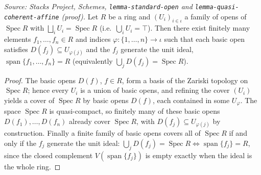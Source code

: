 \begin{lemma}
  \label{lem:exists_finite_basicOpen_subcover}
  \textit{Source: Stacks Project, Schemes, \texttt{lemma-standard-open} and
  \texttt{lemma-quasi-coherent-affine} (proof).}
  Let \(R\) be a ring and \((U_i)_{i \in \iota}\) a family of opens of
  \(\operatorname{Spec} R\) with \(\bigsqcup_i U_i = \operatorname{Spec} R\) (i.e.\
  \(\bigcup_i U_i = \top\)). Then there exist finitely many elements
  \(f_1, \ldots, f_n \in R\) and indices \(\varphi : \{1, \ldots, n\} \to \iota\) such
  that each basic open satisfies \(D(f_j) \subseteq U_{\varphi(j)}\) and the \(f_j\)
  generate the unit ideal, \(\operatorname{span}\{f_1, \ldots, f_n\} = R\) (equivalently
  \(\bigcup_j D(f_j) = \operatorname{Spec} R\)).
\end{lemma}
\begin{proof}

\leanok
  The basic opens \(D(f)\), \(f \in R\), form a basis of the Zariski topology on
  \(\operatorname{Spec} R\); hence every \(U_i\) is a union of basic opens, and refining
  the cover \((U_i)\) yields a cover of \(\operatorname{Spec} R\) by basic opens
  \(D(f)\), each contained in some \(U_{\varphi}\). The space \(\operatorname{Spec} R\)
  is quasi-compact, so finitely many of these basic opens \(D(f_1), \ldots, D(f_n)\)
  already cover \(\operatorname{Spec} R\), with \(D(f_j) \subseteq U_{\varphi(j)}\) by
  construction. Finally a finite family of basic opens covers all of
  \(\operatorname{Spec} R\) if and only if the \(f_j\) generate the unit ideal:
  \(\bigcup_j D(f_j) = \operatorname{Spec} R \iff \operatorname{span}\{f_j\} = R\), since
  the closed complement \(V(\operatorname{span}\{f_j\})\) is empty exactly when the ideal
  is the whole ring.
\end{proof}

